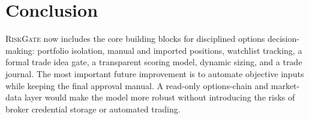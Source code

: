 \documentclass[11pt]{article}
\newcommand{\RiskGate}{\textsc{RiskGate}}
\begin{document}
\section{Conclusion}

\RiskGate{} now includes the core building blocks for disciplined options decision-making: portfolio isolation, manual and imported positions, watchlist tracking, a formal trade idea gate, a transparent scoring model, dynamic sizing, and a trade journal. The most important future improvement is to automate objective inputs while keeping the final approval manual. A read-only options-chain and market-data layer would make the model more robust without introducing the risks of broker credential storage or automated trading.
\end{document}
